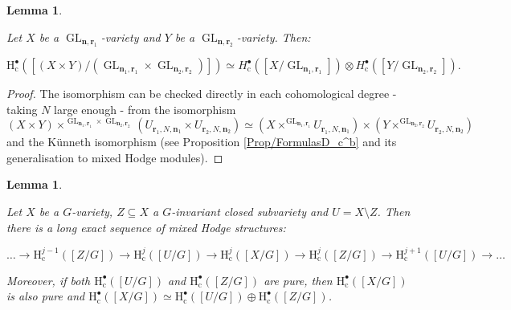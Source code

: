 \documentclass[11pt,english]{article}
\numberwithin{equation}{section}
\numberwithin{figure}{section}
\theoremstyle{definition}
\theoremstyle{plain}
\newtheorem{lem}[df]{Lemma}
\theoremstyle{remark}
\DeclareMathOperator{\GL}{GL}
\newcommand\nn{\mathbf{n}}
\newcommand\rr{\mathbf{r}}
\newcommand\HH{\mathrm{H}}
\begin{document}
\begin{lem} \label{Lem/Kunneth}

Let $X$ be a $\GL_{\nn,\rr_{1}}$-variety and $Y$ be a $\GL_{\nn,\rr_{2}}$-variety.
Then:

\[
\HH_{\mathrm{c}}^{\bullet}([(X\times Y)/(\GL_{\nn_1,\rr_1}\times\GL_{\nn_2,\rr_2})])
\simeq
H_{\mathrm{c}}^{\bullet}([X/\GL_{\nn_1,\rr_1}])
\otimes
H_{\mathrm{c}}^{\bullet}([Y/\GL_{\nn_2,\rr_2}]).
\]

\end{lem}

\begin{proof}

The isomorphism can be checked directly in each cohomological degree
- taking $N$ large enough - from the isomorphism\[
(X\times Y)\times^{\GL_{\nn_1,\rr_1}\times\GL_{\nn_2,\rr_2}}(U_{\rr_1,N,\nn_1}\times U_{\rr_2,N,\nn_2})
\simeq
(X\times^{\GL_{\nn_1,\rr_1}}U_{\rr_1,N,\nn_1})
\times
(Y\times^{\GL_{\nn_2,\rr_2}}U_{\rr_2,N,\nn_2})
\] and the Künneth isomorphism (see Proposition \ref{Prop/FormulasD_c^b}
and its generalisation to mixed Hodge modules). \end{proof}

\begin{lem} \label{Lem/Strat}

Let $X$ be a $G$-variety, $Z\subseteq X$ a $G$-invariant closed
subvariety and $U=X\setminus Z$. Then there is a long exact sequence
of mixed Hodge structures:

\[
\ldots\rightarrow
\HH_{\mathrm{c}}^{j-1}([Z/G])\rightarrow
\HH_{\mathrm{c}}^j([U/G])\rightarrow
\HH_{\mathrm{c}}^j([X/G])\rightarrow
\HH_{\mathrm{c}}^j([Z/G])\rightarrow
\HH_{\mathrm{c}}^{j+1}([U/G]) \rightarrow \ldots
\] 

Moreover, if both $\HH_{\mathrm{c}}^{\bullet}([U/G])$ and $\HH_{\mathrm{c}}^{\bullet}([Z/G])$
are pure, then $\HH_{\mathrm{c}}^{\bullet}([X/G])$ is also pure and
$\HH_{\mathrm{c}}^{\bullet}([X/G])\simeq\HH_{\mathrm{c}}^{\bullet}([U/G])\oplus\HH_{\mathrm{c}}^{\bullet}([Z/G])$.

\end{lem}
\end{document}

